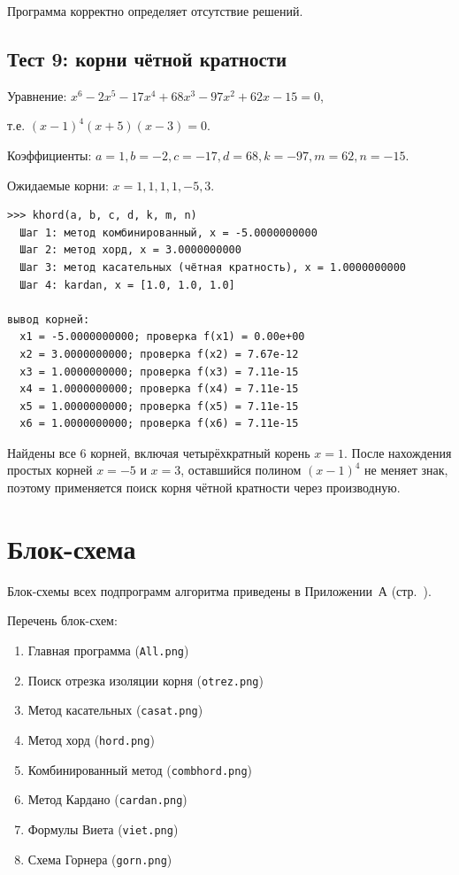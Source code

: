 \documentclass[a4paper,14pt]{extarticle}
\begin{document}
Программа корректно определяет отсутствие решений.

\subsection*{Тест 9: корни чётной кратности}

Уравнение: $x^6 - 2x^5 - 17x^4 + 68x^3 - 97x^2 + 62x - 15 = 0$,

т.е. $(x - 1)^4 (x + 5)(x - 3) = 0$.

Коэффициенты: $a=1, b=-2, c=-17, d=68, k=-97, m=62, n=-15$.

Ожидаемые корни: $x = 1, 1, 1, 1, -5, 3$.

\begin{Verbatim}[frame=single,fontsize=\footnotesize]
>>> khord(a, b, c, d, k, m, n)
  Шаг 1: метод комбинированный, x = -5.0000000000
  Шаг 2: метод хорд, x = 3.0000000000
  Шаг 3: метод касательных (чётная кратность), x = 1.0000000000
  Шаг 4: kardan, x = [1.0, 1.0, 1.0]

вывод корней:
  x1 = -5.0000000000; проверка f(x1) = 0.00e+00
  x2 = 3.0000000000; проверка f(x2) = 7.67e-12
  x3 = 1.0000000000; проверка f(x3) = 7.11e-15
  x4 = 1.0000000000; проверка f(x4) = 7.11e-15
  x5 = 1.0000000000; проверка f(x5) = 7.11e-15
  x6 = 1.0000000000; проверка f(x6) = 7.11e-15
\end{Verbatim}

Найдены все 6 корней, включая четырёхкратный корень $x = 1$. После нахождения простых корней $x = -5$ и $x = 3$, оставшийся полином $(x-1)^4$ не меняет знак, поэтому применяется поиск корня чётной кратности через производную.

\newpage
\section*{Блок-схема}
\label{sec:flowchart}

Блок-схемы всех подпрограмм алгоритма приведены в Приложении~А (стр.~\pageref{sec:appendix}).

Перечень блок-схем:
\begin{enumerate}
  \item Главная программа (\texttt{All.png})
  \item Поиск отрезка изоляции корня (\texttt{otrez.png})
  \item Метод касательных (\texttt{casat.png})
  \item Метод хорд (\texttt{hord.png})
  \item Комбинированный метод (\texttt{combhord.png})
  \item Метод Кардано (\texttt{cardan.png})
  \item Формулы Виета (\texttt{viet.png})
  \item Схема Горнера (\texttt{gorn.png})
\end{enumerate}
\end{document}

